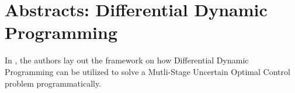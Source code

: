 \chapter{Abstracts: Differential Dynamic Programming}

In \cite{Qian2014Jul}, the authors lay out the framework on how Differential 
Dynamic Programming can be utilized to solve a Mutli-Stage Uncertain 
Optimal Control problem programmatically.




